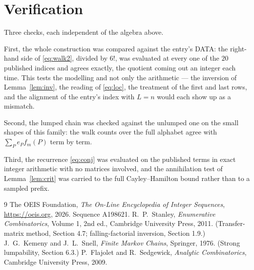 \documentclass[11pt,a4paper]{article}
\theoremstyle{plain}
\theoremstyle{definition}
\begin{document}
\section{Verification}

Three checks, each independent of the algebra above.

First, the whole construction was compared against the entry's DATA: the right-hand side of
\eqref{eq:walk2}, divided by $6!$, was evaluated at every one of the $20$
published indices and agrees exactly, the quotient coming out an integer each time. This
tests the modelling and not only the arithmetic --- the inversion of Lemma~\ref{lem:inv},
the reading of \eqref{eq:loc}, the treatment of the first and last rows, and the
alignment of the entry's index with $L=n$ would each show up as a mismatch.

Second, the lumped chain was checked against the unlumped one on the small shapes of this
family: the walk counts over the full alphabet agree with $\sum_P e_Pf_m(P)$ term by term.

Third, the recurrence \eqref{eq:conj} was evaluated on the published terms in exact integer
arithmetic with no matrices involved, and the annihilation test of Lemma~\ref{lem:crit} was
carried to the full Cayley--Hamilton bound rather than to a sampled prefix.

\begin{thebibliography}{9}
 The OEIS Foundation, \emph{The On-Line Encyclopedia of Integer
Sequences}, \url{https://oeis.org}, 2026. Sequence A198621.
 R.~P.~Stanley, \emph{Enumerative Combinatorics}, Volume 1, 2nd ed.,
Cambridge University Press, 2011. (Transfer-matrix method, Section 4.7; falling-factorial
inversion, Section 1.9.)
 J.~G.~Kemeny and J.~L.~Snell, \emph{Finite Markov Chains}, Springer,
1976. (Strong lumpability, Section 6.3.)
 P.~Flajolet and R.~Sedgewick, \emph{Analytic Combinatorics}, Cambridge
University Press, 2009.
\end{thebibliography}
\end{document}

